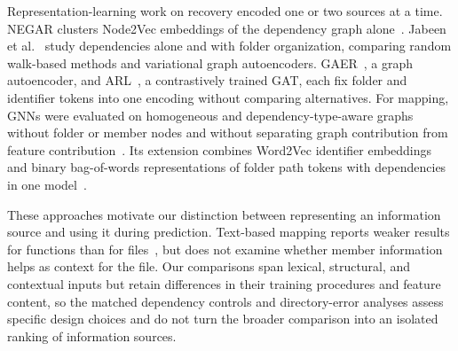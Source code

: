 Representation-learning work on recovery encoded one or two sources at a time. NEGAR clusters Node2Vec embeddings of the dependency graph alone~\cite{negar}. Jabeen et al.~\cite{structsar} study dependencies alone and with folder organization, comparing random walk-based methods and variational graph autoencoders. GAER~\cite{gaer}, a graph autoencoder, and ARL~\cite{arl_2026}, a contrastively trained GAT, each fix folder and identifier tokens into one encoding without comparing alternatives. For mapping, GNNs were evaluated on homogeneous and dependency-type-aware graphs without folder or member nodes and without separating graph contribution from feature contribution~\cite{jabeen2025graph}. Its extension combines Word2Vec identifier embeddings and binary bag-of-words representations of folder path tokens with dependencies in one model~\cite{c2a_mapping}.

These approaches motivate our distinction between representing an information source and using it during prediction. Text-based mapping reports weaker results for functions than for files~\cite{johansson2026mapping}, but does not examine whether member information helps as context for the file. Our comparisons span lexical, structural, and contextual inputs but retain differences in their training procedures and feature content, so the matched dependency controls and directory-error analyses assess specific design choices and do not turn the broader comparison into an isolated ranking of information sources.